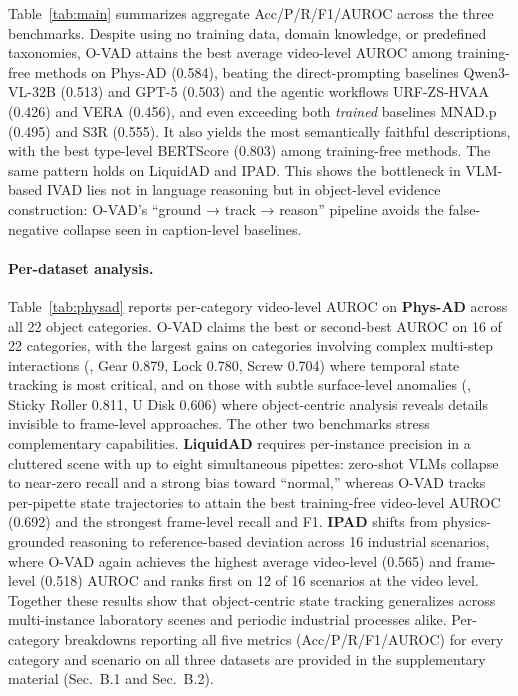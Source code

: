 \documentclass[runningheads]{llncs}
\begin{document}
Table~\ref{tab:main} summarizes aggregate Acc/P/R/F1/AUROC across the three benchmarks. Despite using no training data, domain knowledge, or predefined taxonomies, O-VAD attains the best average video-level AUROC among training-free methods on Phys-AD (0.584), beating the direct-prompting baselines Qwen3-VL-32B (0.513) and GPT-5 (0.503) and the agentic workflows URF-ZS-HVAA (0.426) and VERA (0.456), and even exceeding both \emph{trained} baselines MNAD.p (0.495) and S3R (0.555). It also yields the most semantically faithful descriptions, with the best type-level BERTScore (0.803) among training-free methods. The same pattern holds on LiquidAD and IPAD. This shows the bottleneck in VLM-based IVAD lies not in language reasoning but in object-level evidence construction: O-VAD's ``ground → track → reason'' pipeline avoids the false-negative collapse seen in caption-level baselines.

\paragraph{\textbf{Per-dataset analysis.}}
Table~\ref{tab:physad} reports per-category video-level AUROC on \textbf{Phys-AD} across all 22 object categories. O-VAD claims the best or second-best AUROC on 16 of 22 categories, with the largest gains on categories involving complex multi-step interactions (\eg, Gear 0.879, Lock 0.780, Screw 0.704) where temporal state tracking is most critical, and on those with subtle surface-level anomalies (\eg, Sticky Roller 0.811, U Disk 0.606) where object-centric analysis reveals details invisible to frame-level approaches. The other two benchmarks stress complementary capabilities. \textbf{LiquidAD} requires per-instance precision in a cluttered scene with up to eight simultaneous pipettes: zero-shot VLMs collapse to near-zero recall and a strong bias toward ``normal,'' whereas O-VAD tracks per-pipette state trajectories to attain the best training-free video-level AUROC (0.692) and the strongest frame-level recall and F1. \textbf{IPAD} shifts from physics-grounded reasoning to reference-based deviation across 16 industrial scenarios, where O-VAD again achieves the highest average video-level (0.565) and frame-level (0.518) AUROC and ranks first on 12 of 16 scenarios at the video level. Together these results show that object-centric state tracking generalizes across multi-instance laboratory scenes and periodic industrial processes alike. Per-category breakdowns reporting all five metrics (Acc/P/R/F1/AUROC) for every category and scenario on all three datasets are provided in the supplementary material (Sec.~B.1 and Sec.~B.2).
\end{document}
